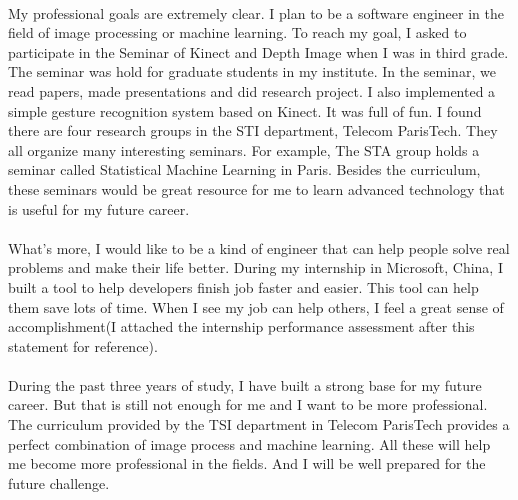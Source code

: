 \documentclass[a4paper]{article}
\begin{document}
\paragraph{}
My professional goals are extremely clear. I plan to be a software engineer in the field of image processing or machine learning. To reach my goal, I asked to participate in the Seminar of Kinect and Depth Image when I was in third grade. The seminar was hold for graduate students in my institute. In the seminar, we read papers, made presentations and did research project. I also implemented a simple gesture recognition system based on Kinect. It was full of fun. I found there are four research groups in the STI department, Telecom ParisTech. They all organize many interesting seminars. For example, The STA group holds a seminar called Statistical Machine Learning in Paris. Besides the curriculum, these seminars would be great resource for me to learn advanced technology that is useful for my future career. 
\paragraph{}
What's more, I would like to be a kind of engineer that can help people solve real problems and make their life better. During my internship in Microsoft, China, I built a tool to help developers finish job faster and easier. This tool can help them save lots of time. When I see my job can help others, I feel a great sense of accomplishment(I attached the internship performance assessment after this statement for reference).
\paragraph{}   
During the past three years of study, I have built a strong base for my future career. But that is still not enough for me and I want to be more professional. The curriculum provided by the TSI department in Telecom ParisTech provides a perfect combination of image process and machine learning. All these will help me become more professional in the fields. And I will be well prepared for the future challenge.
\end{document}
